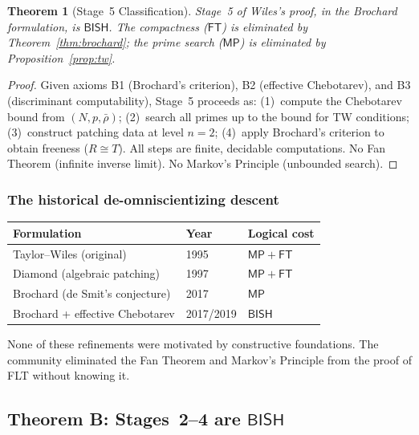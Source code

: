 \documentclass[11pt]{article}
\theoremstyle{plain}
\newtheorem{theorem}{Theorem}[section]
\theoremstyle{definition}
\theoremstyle{remark}
\newcommand{\BISH}{\mathsf{BISH}}
\newcommand{\MP}{\mathsf{MP}}
\newcommand{\FT}{\mathsf{FT}}
\begin{document}
\begin{theorem}[Stage~5 Classification]\label{thm:stage5}
Stage~5 of Wiles's proof, in the Brochard formulation, is
$\BISH$.  The compactness ($\FT$) is eliminated by
Theorem~\ref{thm:brochard}; the prime search ($\MP$) is
eliminated by Proposition~\ref{prop:tw}.
\end{theorem}

\begin{proof}
Given axioms B1 (Brochard's criterion), B2 (effective Chebotarev),
and B3 (discriminant computability), Stage~5 proceeds as:
(1)~compute the Chebotarev bound from $(N,p,\bar{\rho})$;
(2)~search all primes up to the bound for TW conditions;
(3)~construct patching data at level $n = 2$;
(4)~apply Brochard's criterion to obtain freeness ($R \cong T$).
All steps are finite, decidable computations.  No Fan Theorem
(infinite inverse limit).  No Markov's Principle (unbounded search).
\end{proof}

\subsubsection{The historical de-omniscientizing descent}

\begin{center}
\renewcommand{\arraystretch}{1.15}
\begin{tabular}{@{}lll@{}}
\toprule
\textbf{Formulation} & \textbf{Year} & \textbf{Logical cost} \\
\midrule
Taylor--Wiles (original) & 1995 & $\MP + \FT$ \\
Diamond (algebraic patching) & 1997 & $\MP + \FT$ \\
Brochard (de Smit's conjecture) & 2017 & $\MP$ \\
Brochard + effective Chebotarev & 2017/2019 & $\BISH$ \\
\bottomrule
\end{tabular}
\end{center}

\medskip\noindent
None of these refinements were motivated by constructive
foundations.  The community eliminated the Fan Theorem and
Markov's Principle from the proof of FLT without knowing it.


\subsection{Theorem B: Stages~2--4 are \texorpdfstring{$\BISH$}{BISH}}\label{sec:alg}
\end{document}
